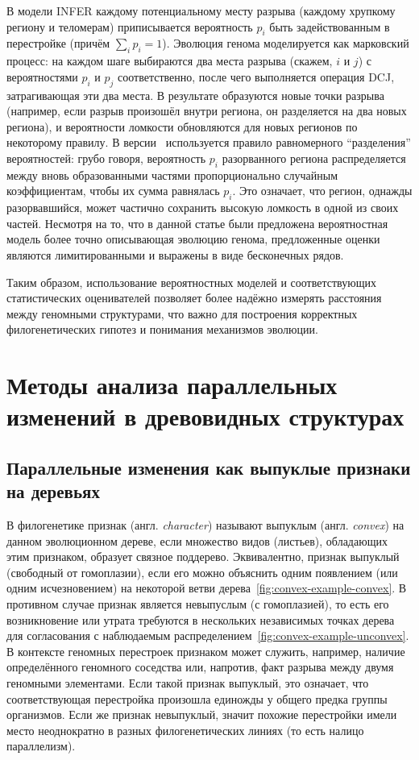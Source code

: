 В модели INFER каждому потенциальному месту разрыва (каждому хрупкому региону и теломерам) приписывается вероятность $p_i$ быть задействованным в перестройке (причём $\sum_i p_i = 1$).
Эволюция генома моделируется как марковский процесс: на каждом шаге выбираются два места разрыва (скажем, $i$ и $j$) с вероятностями $p_i$ и $p_j$ соответственно, после чего выполняется операция DCJ, затрагивающая эти два места.
В результате образуются новые точки разрыва (например, если разрыв произошёл внутри региона, он разделяется на два новых региона), и вероятности ломкости обновляются для новых регионов по некоторому правилу.
В версии~\cite{tannier2016} используется правило равномерного ``разделения'' вероятностей: грубо говоря, вероятность $p_i$ разорванного региона распределяется между вновь образованными частями пропорционально случайным коэффициентам, чтобы их сумма равнялась $p_i$.
Это означает, что регион, однажды разорвавшийся, может частично сохранить высокую ломкость в одной из своих частей.
Несмотря на то, что в данной статье были предложена вероятностная модель более точно описывающая эволюцию генома, предложенные оценки являются лимитированными и выражены в виде бесконечных рядов.

Таким образом, использование вероятностных моделей и соответствующих статистических оценивателей позволяет более надёжно измерять расстояния между геномными структурами, что важно для построения корректных филогенетических гипотез и понимания механизмов эволюции.

\section{Методы анализа параллельных изменений в древовидных структурах}
\label{sec:dirichlet_model}

\subsection{Параллельные изменения как выпуклые признаки на деревьях}
\label{subsec:modified_dcj}

В филогенетике признак (англ. \textit{character}) называют выпуклым (англ. \textit{convex}) на данном эволюционном дереве, если множество видов (листьев), обладающих этим признаком, образует связное поддерево.
Эквивалентно, признак выпуклый (свободный от гомоплазии), если его можно объяснить одним появлением (или одним исчезновением) на некоторой ветви дерева~\ref{fig:convex-example-convex}.
В противном случае признак является невыпуслым (с гомоплазией), то есть его возникновение или утрата требуются в нескольких независимых точках дерева для согласования с наблюдаемым распределением~\ref{fig:convex-example-unconvex}.
В контексте геномных перестроек признаком может служить, например, наличие определённого геномного соседства или, напротив, факт разрыва между двумя геномными элементами.
Если такой признак выпуклый, это означает, что соответствующая перестройка произошла единожды у общего предка группы организмов.
Если же признак невыпуклый, значит похожие перестройки имели место неоднократно в разных филогенетических линиях (то есть налицо параллелизм).

